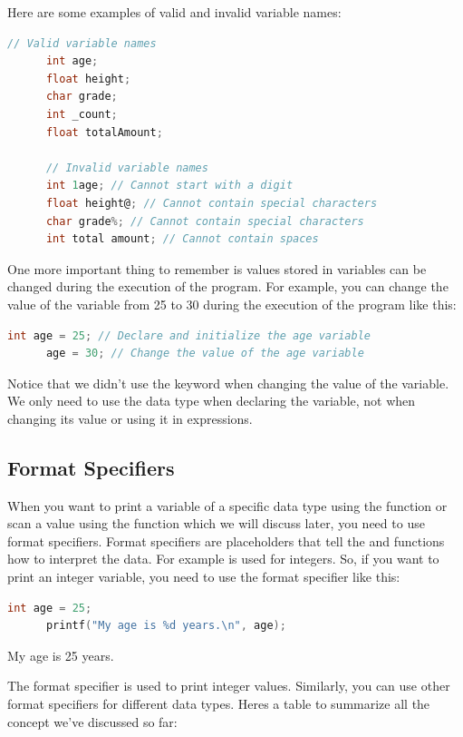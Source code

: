 \documentclass[12pt, openany]{book}
\begin{document}
  Here are some examples of valid and invalid variable names:
  \begin{lstlisting}[language=C, caption=Valid and Invalid Variable Names]
      // Valid variable names
      int age;
      float height;
      char grade;
      int _count;
      float totalAmount;
      
      // Invalid variable names
      int 1age; // Cannot start with a digit
      float height@; // Cannot contain special characters
      char grade%; // Cannot contain special characters
      int total amount; // Cannot contain spaces
  \end{lstlisting}
  
  \noindent One more important thing to remember is values stored in variables can be changed during the execution of the program. For example, you can change the value of the  variable from 25 to 30 during the execution of the program like this:
  \begin{lstlisting}[language=C, caption=Changing Variable Values]
      int age = 25; // Declare and initialize the age variable
      age = 30; // Change the value of the age variable
  \end{lstlisting}
  \noindent Notice that we didn't use the  keyword when changing the value of the variable. We only need to use the data type when declaring the variable, not when changing its value or using it in expressions.
  
  \subsection{Format Specifiers}
  When you want to print a variable of a specific data type using the  function or scan a value using the  function which we will discuss later, you need to use format specifiers. Format specifiers are placeholders that tell the  and  functions how to interpret the data. For example  is used for integers. So, if you want to print an integer variable, you need to use the  format specifier like this:
  \begin{lstlisting}[language=C, caption=Using Format Specifiers]
      int age = 25;
      printf("My age is %d years.\n", age);
  \end{lstlisting}
  \begin{tcolorbox}[colback=lightgray!10, colframe=black, title=Output]
      My age is 25 years.
  \end{tcolorbox}
  \noindent The  format specifier is used to print integer values. Similarly, you can use other format specifiers for different data types. Heres a table to summarize all the concept we've discussed so far:
  
\end{document}

